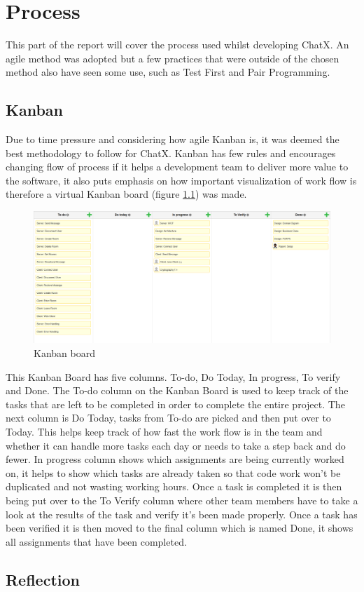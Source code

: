 \chapter{Process}
This part of the report will cover the process used whilst developing ChatX. An agile method was adopted but a few practices that were outside of the chosen method also have seen some use, such as Test First and Pair Programming.

\section{Kanban}
Due to time pressure and considering how agile Kanban is, it was deemed the best methodology to follow for ChatX. Kanban has few rules and encourages changing flow of process if it helps a development team to deliver more value to the software, it also puts emphasis on how important visualization of work flow is therefore a virtual Kanban board (figure \ref{fig:KanbanBoard}) was made.  %

\begin{figure}[H]
\centering
\includegraphics[width=0.7\linewidth]{"img/Kanban Board"}
\caption{Kanban board}
\label{fig:KanbanBoard}
\end{figure}

This Kanban Board has five columns. To-do, Do Today, In progress, To verify and Done. 
The To-do column on the Kanban Board is used to keep track of the tasks that are left to be completed in order to complete the entire project. The next column is Do Today, tasks from To-do are picked and then put over to Today. This helps keep track of how fast the work flow is in the team and whether it can handle more tasks each day or needs to take a step back and do fewer. In progress column shows which assignments are being currently worked on, it helps to show which tasks are already taken so that code work won't be duplicated and not wasting working hours. Once a task is completed it is then being put over to the To Verify column where other team members have to take a look at the results of the task and verify it's been made properly. Once a task has been verified it is then moved to the final column which is named Done, it shows all assignments that have been completed. %

\section{Reflection}